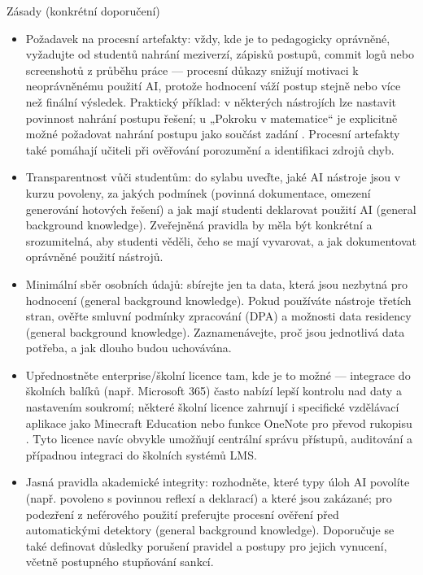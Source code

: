 \documentclass{report}%
\begin{document}
Zásady (konkrétní doporučení)
\begin{itemize}
  \item Požadavek na procesní artefakty: vždy, kde je to pedagogicky oprávněné, vyžadujte od studentů nahrání meziverzí, zápisků postupů, commit logů nebo screenshotů z průběhu práce — procesní důkazy snižují motivaci k neoprávněnému použití AI, protože hodnocení váží postup stejně nebo více než finální výsledek. Praktický příklad: v některých nástrojích lze nastavit povinnost nahrání postupu řešení; u „Pokroku v matematice“ je explicitně možné požadovat nahrání postupu jako součást zadání \cite{kb_ai_101_tipu_pdf_04e4a115_page_8_1}. Procesní artefakty také pomáhají učiteli při ověřování porozumění a identifikaci zdrojů chyb.
  \item Transparentnost vůči studentům: do sylabu uveďte, jaké AI nástroje jsou v kurzu povoleny, za jakých podmínek (povinná dokumentace, omezení generování hotových řešení) a jak mají studenti deklarovat použití AI (general background knowledge). Zveřejněná pravidla by měla být konkrétní a srozumitelná, aby studenti věděli, čeho se mají vyvarovat, a jak dokumentovat oprávněné použití nástrojů.
  \item Minimální sběr osobních údajů: sbírejte jen ta data, která jsou nezbytná pro hodnocení (general background knowledge). Pokud používáte nástroje třetích stran, ověřte smluvní podmínky zpracování (DPA) a možnosti data residency (general background knowledge). Zaznamenávejte, proč jsou jednotlivá data potřeba, a jak dlouho budou uchovávána.
  \item Upřednostněte enterprise/školní licence tam, kde je to možné — integrace do školních balíků (např. Microsoft 365) často nabízí lepší kontrolu nad daty a nastavením soukromí; některé školní licence zahrnují i specifické vzdělávací aplikace jako Minecraft Education nebo funkce OneNote pro převod rukopisu \cite{kb_ai_101_tipu_pdf_04e4a115_page_15_2, kb_ai_101_tipu_pdf_04e4a115_page_14_1}. Tyto licence navíc obvykle umožňují centrální správu přístupů, auditování a případnou integraci do školních systémů LMS.
  \item Jasná pravidla akademické integrity: rozhodněte, které typy úloh AI povolíte (např. povoleno s povinnou reflexí a deklarací) a které jsou zakázané; pro podezření z neférového použití preferujte procesní ověření před automatickými detektory (general background knowledge). Doporučuje se také definovat důsledky porušení pravidel a postupy pro jejich vynucení, včetně postupného stupňování sankcí.
\end{itemize}
\end{document}
